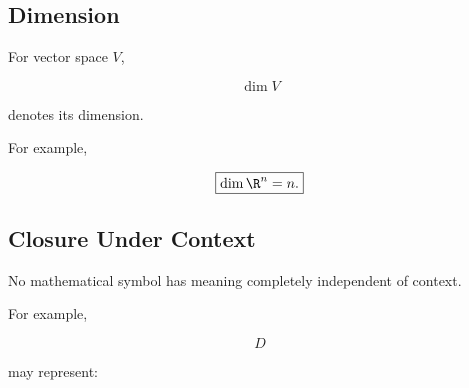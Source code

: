\subsection{Dimension}
\label{subsec:dimension-reference}

For vector space \(V\),

\[
\boxed{
\dim V
}
\]

denotes its dimension.

For example,

\[
\boxed{
\dim\R^n=n.
}
\]

\subsection{Closure Under Context}
\label{subsec:notation-context-principle}

No mathematical symbol has meaning completely independent of context.

For example,

\[
\boxed{
D
}
\]

may represent:

